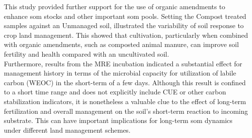 	This study provided further support for the use of organic amendments to enhance \gls{som} stocks and other important \gls{som} pools. Setting the Compost treated samples against an Unmanaged soil, illustrated the variability of soil response to crop land management. This showed that cultivation, particularly when combined with organic amendments, such as composted animal manure, can improve soil fertility and health compared with an uncultivated soil.\\
	Furthermore, results from the MRE incubation indicated a substantial effect for management history in terms of the microbial capacity for utilization of labile carbon (WEOC) in the short-term of a few days. Although this result is confined to a short time range and does not explicitly include CUE or other carbon stabilization indicators, it is nonetheless a valuable clue to the effect of long-term fertilization and overall management on the soil's short-term reaction to incoming substrate. This can have important implications for long-term \gls{som} dynamics under different land management schemes.  
	         
	
	
     
